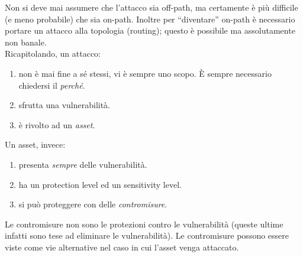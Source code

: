 Non si deve mai assumere che l'attacco sia off-path, ma certamente è più difficile (e meno probabile) che sia on-path. Inoltre per “diventare” on-path è necessario portare un attacco alla topologia (routing); questo è possibile ma assolutamente non banale.\\
Ricapitolando, un attacco:
\begin{enumerate}
	\item non è mai fine a sé stessi, vi è sempre uno scopo. È sempre necessario chiedersi il \textit{perché}.
	\item sfrutta una vulnerabilità.
	\item è rivolto ad un \textit{asset}.
\end{enumerate}
Un asset, invece:
\begin{enumerate}
	\item presenta \textit{sempre} delle vulnerabilità.
	\item ha un protection level ed un sensitivity level.
	\item si può proteggere con delle \textit{contromisure}.
\end{enumerate}
Le contromisure non sono le protezioni contro le vulnerabilità (queste ultime infatti sono tese ad eliminare le vulnerabilità). Le contromisure possono essere viste come vie alternative nel caso in cui l'asset venga attaccato.